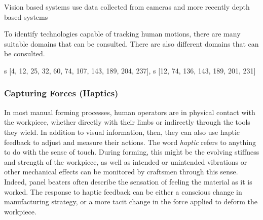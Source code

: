 Vision based systems use data collected from cameras and more recently depth based systems


To identify technologies capable of tracking human motions, there are many suitable domains that can be consulted. 
There are also different domains that can be consulted. 

s [4, 12, 25, 32, 60, 74, 107, 143, 189, 204, 237],
s [12, 74, 136, 143, 189, 201, 231] 




\subsubsection{Capturing Forces (Haptics)}
In most manual forming processes, human operators are in physical contact with the workpiece, whether directly with their limbs or indirectly through the tools they wield. In addition to visual information, then, they can also use haptic feedback to adjust and measure their actions. The word \textit{haptic} refers to anything to do with the sense of touch. During forming, this might be the evolving stiffness and strength of the workpiece, as well as intended or unintended vibrations or other mechanical effects can be monitored by craftsmen through this sense. Indeed, panel beaters often describe the sensation of feeling the material as it is worked. The response to haptic feedback can be either a conscious change in manufacturing strategy, or a more tacit change in the force applied to deform the workpiece. 

